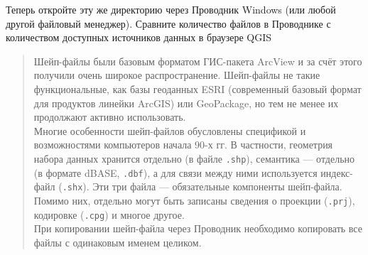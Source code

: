\documentclass[
  12pt,
]{book}
\begin{document}
Теперь откройте эту же директорию через Проводник Windows (или любой другой файловый менеджер). Сравните количество файлов в Проводнике с количеством доступных источников данных в браузере QGIS

\begin{quote}
Шейп-файлы были базовым форматом ГИС-пакета ArcView и за счёт этого получили очень широкое распространение. Шейп-файлы не такие функциональные, как базы геоданных ESRI (современный базовый формат для продуктов линейки ArcGIS) или GeoPackage, но тем не менее их продолжают активно использовать.\\
Многие особенности шейп-файлов обусловлены спецификой и возможностями компьютеров начала 90-х гг. В частности, геометрия набора данных хранится отдельно (в файле \texttt{.shp}), семантика --- отдельно (в формате dBASE, \texttt{.dbf}), а для связи между ними используется индекс-файл (\texttt{.shx}). Эти три файла --- обязательные компоненты шейп-файла. Помимо них, отдельно могут быть записаны сведения о проекции (\texttt{.prj}), кодировке (\texttt{.cpg}) и многое другое.\\
При копировании шейп-файла через Проводник необходимо копировать все файлы с одинаковым именем целиком.
\end{quote}
\end{document}
